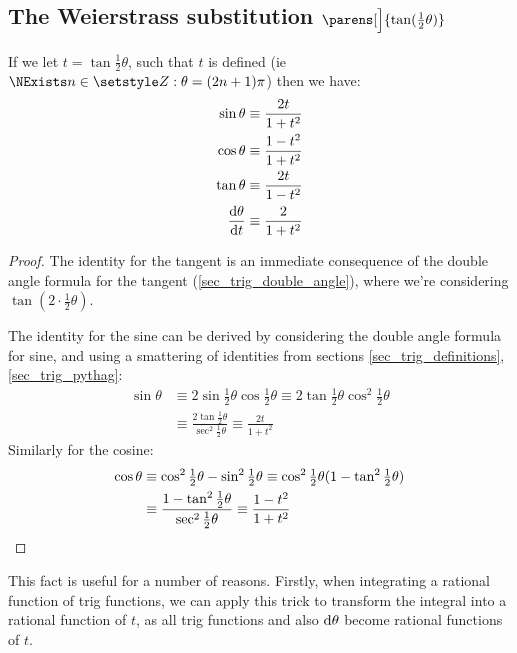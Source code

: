 \subsection[The Weierstrass substitution
            \texorpdfstring{(\(\tan(\theta / 2)\))}{(tangent half-angle)}]
   {The Weierstrass substitution \boldmath\(\parens[\Big]{\tan(\tfrac 12 \theta)}\)}

\begin{theorem}
If we let \(t = \tan \tfrac 12 \theta\), such that \(t\) is defined (ie
\(\NExists n \in \Integers: \theta = (2n + 1)\pi\)) then we have:
\begin{align*}
\sin \theta &\equiv \frac{2t}{1 + t^2} \\
\cos \theta &\equiv \frac{1 - t^2}{1 + t^2} \\
\tan \theta &\equiv \frac{2t}{1 - t^2} \\
\dv<\theta>{t} &\equiv \frac 2{1 + t^2}
\end{align*}
\end{theorem}
\begin{proof}
The identity for the tangent is an immediate consequence of the double
angle formula for the tangent (\ref{sec_trig_double_angle}), where we're
considering \(\tan{(2 \cdot \frac 12 \theta)}\).

The identity for the sine can be derived by considering the double angle
formula for sine, and using a smattering of identities from sections
\ref{sec_trig_definitions}, \ref{sec_trig_pythag}:
\begin{align*}
\sin \theta &\equiv 2\sin \tfrac 12 \theta \cos\tfrac 12 \theta
    \equiv 2\tan \tfrac 12 \theta \cos^2 \tfrac 12 \theta \\
    &\equiv \frac{2\tan \tfrac 12 \theta}{\sec^2 \tfrac 12 \theta}
    \equiv \frac{2t}{1 + t^2}
\end{align*}
Similarly for the cosine:
\begin{align*}
\cos \theta
    &\equiv \cos^2 \tfrac 12 \theta - \sin^2 \tfrac 12 \theta
    \equiv \cos^2 \tfrac 12 \theta
        (1 - \tan^2 \tfrac 12 \theta) \\
    &\equiv \frac{1 - \tan^2 \tfrac 12 \theta}
                 {\sec^2 \tfrac 12 \theta}
    \equiv \frac{1 - t^2}{1 + t^2} \qedhere
\end{align*}
\end{proof}

This fact is useful for a number of reasons. Firstly, when integrating a
rational function of trig functions, we can apply this trick to transform
the integral into a rational function of \(t\), as all trig functions and
also \(\mathrm d \theta\) become rational functions of \(t\).

